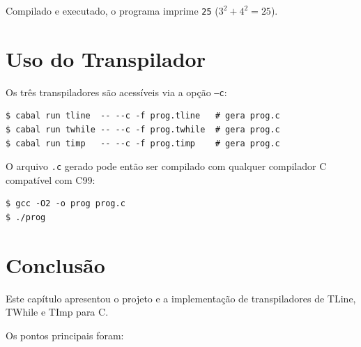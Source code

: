 Compilado e executado, o programa imprime \texttt{25} ($3^2 + 4^2 = 25$).

\section{Uso do Transpilador}\label{sec:transp-uso}

Os três transpiladores são acessíveis via a opção \texttt{--c}:

\begin{verbatim}
$ cabal run tline  -- --c -f prog.tline   # gera prog.c
$ cabal run twhile -- --c -f prog.twhile  # gera prog.c
$ cabal run timp   -- --c -f prog.timp    # gera prog.c
\end{verbatim}

O arquivo \texttt{.c} gerado pode então ser compilado com qualquer compilador
C compatível com C99:

\begin{verbatim}
$ gcc -O2 -o prog prog.c
$ ./prog
\end{verbatim}

\section{Conclusão}\label{sec:transp-conclusao}

Este capítulo apresentou o projeto e a implementação de transpiladores de
TLine, TWhile e TImp para C.

Os pontos principais foram:

